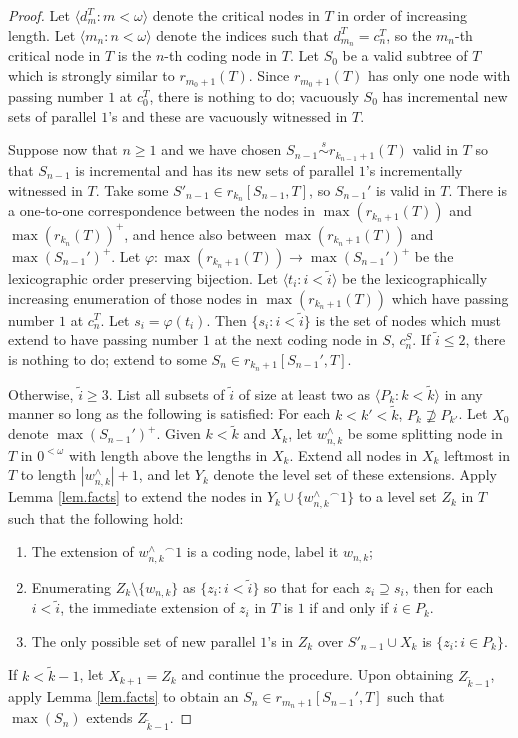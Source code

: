 \documentclass{amsart}
\theoremstyle{remark}
\theoremstyle{definition}
\theoremstyle{remark}
\newcommand{\om}{\omega}
\newcommand{\contains}{\supseteq}
\newcommand{\ssim}{\stackrel{s}{\sim}}
\newcommand{\ra}{\rightarrow}
\newcommand{\lgl}{\langle}
\newcommand{\rgl}{\rangle}
\begin{document}
\begin{proof}
Let  $\lgl d^T_m:m<\om\rgl$ denote the critical nodes in $T$ in order of  increasing length.
Let
$\lgl m_n:n<\om\rgl$ denote the indices
such that $d^T_{m_n}=c^T_n$, so the $m_n$-th critical node in $T$ is the $n$-th coding node in $T$.
Let $S_0$ be a valid subtree of $T$ which is strongly similar to $r_{m_0+1}(T)$.
Since $r_{m_0+1}(T)$ has only one node with passing number $1$ at $c^T_0$,
there is nothing to do;
vacuously $S_0$ has  incremental new sets of parallel $1$'s and these are vacuously witnessed in $T$.


Suppose now that $n\ge 1$ and we have chosen $S_{n-1}\ssim r_{k_{n-1}+1}(T)$
 valid in $T$ so that $S_{n-1}$ is incremental and has its new sets of parallel $1$'s incrementally witnessed in $T$.
Take some $S'_{n-1}\in r_{k_n}[S_{n-1},T]$, so $S_{n-1}'$ is valid in $T$.
There   is a one-to-one correspondence between the nodes in  $\max(r_{k_n+1}(T))$ and $\max(r_{k_n}(T))^+$,
and hence also between   $\max(r_{k_n+1}(T))$ and
$\max(S_{n-1}')^+$.
Let $\varphi :\max(r_{k_n+1}(T))\ra \max(S_{n-1}')^+$ be the lexicographic order preserving bijection.
Let $\lgl t_i:i<\tilde{i}\rgl$ be the lexicographically increasing enumeration of those nodes in $\max(r_{k_n+1}(T))$ which have passing number $1$ at $c^T_n$.
Let $s_i=\varphi(t_i)$.
Then $\{s_i:i<\tilde{i}\}$ is the set of nodes which must extend to have passing number $1$ at  the next coding node in $S$, $c^S_n$.
If $\tilde{i}\le 2$, there is nothing to do; extend to some $S_n\in r_{k_n+1}[S_{n-1}',T]$.


Otherwise, $\tilde{i}\ge 3$.
List all subsets of $\tilde{i}$ of size at least two as $\lgl P_k:k<\tilde{k}\rgl$ in any manner so long as the following is satisfied:
For each $k<k'<\tilde{k}$, $P_k\not\contains P_{k'}$.
Let $X_0$ denote $\max(S_{n-1}')^+$.
Given $k<\tilde{k}$
 and $X_k$,
let  $w_{n,k}^{\wedge}$ be
some splitting node in $T$ in $0^{<\om}$ with length
above the lengths in $X_k$.
Extend all nodes in $X_k$ leftmost in $T$ to length $|w_{n,k}^{\wedge}|+1$,
and let $Y_k$ denote the level  set of these extensions.
Apply Lemma \ref{lem.facts} to
extend the nodes in  $Y_k\cup\{{w_{n,k}^{\wedge}}^{\frown}1\}$ to a  level set $Z_k$ in $T$ such that the following hold:
\begin{enumerate}
\item
The extension of ${w_{n,k}^{\wedge}}^{\frown}1$ is a coding node, label it $w_{n,k}$;
\item
Enumerating $Z_k\setminus\{w_{n,k}\}$ as $\{z_i:i<\tilde{i}\}$ so that for each  $z_i\contains s_i$,
then
for each $i<\tilde{i}$, the immediate extension of $z_i$ in $T$ is $1$ if and only if $i\in P_k$.
\item
The only possible set of new parallel $1$'s in $Z_k$ over $S'_{n-1}\cup X_k$ is $\{z_i:i\in P_k\}$.
\end{enumerate}
If $k<\tilde{k}-1$,
let $X_{k+1}=Z_k$ and continue the procedure.
Upon obtaining $Z_{\tilde{k}-1}$,
apply Lemma \ref{lem.facts}
to obtain an $S_n\in r_{m_n+1}[S_{n-1}',T]$
such that $\max(S_n)$ extends $Z_{\tilde{k}-1}$.




\end{proof}
\end{document}
